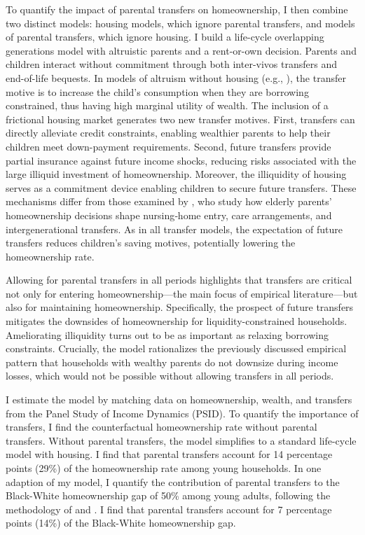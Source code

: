 \documentclass[12pt]{article}
\begin{document}
To quantify the impact of parental transfers on homeownership, I then combine two distinct models: housing models, which ignore parental transfers, and models of parental transfers, which ignore housing. I build a life-cycle overlapping generations model with altruistic parents and a rent-or-own decision. Parents and children interact without commitment through both inter-vivos transfers and end-of-life bequests. In models of altruism without housing (e.g., \citealp{Altonji1997a,Barczyk2014}), the transfer motive is to increase the child's consumption when they are borrowing constrained, thus having high marginal utility of wealth. The inclusion of a frictional housing market generates two new transfer motives. First, transfers can directly alleviate credit constraints, enabling wealthier parents to help their children meet down-payment requirements. Second, future transfers provide partial insurance against future income shocks, reducing risks associated with the large illiquid investment of homeownership. Moreover, the illiquidity of housing serves as a commitment device enabling children to secure future transfers. These mechanisms differ from those examined by \citet{Barczyk2020a}, who study how elderly parents’ homeownership decisions shape nursing‑home entry, care arrangements, and intergenerational transfers. As in all transfer models, the expectation of future transfers reduces children's saving motives, potentially lowering the homeownership rate.

Allowing for parental transfers in all periods highlights that transfers are critical not only for entering homeownership---the main focus of empirical literature---but also for maintaining homeownership. Specifically, the prospect of future transfers mitigates the downsides of homeownership for liquidity-constrained households. Ameliorating illiquidity turns out to be as important as relaxing borrowing constraints. Crucially, the model rationalizes the previously discussed empirical pattern that households with wealthy parents do not downsize during income losses, which would not be possible without allowing transfers in all periods. 

I estimate the model by matching data on homeownership, wealth, and transfers from the Panel Study of Income Dynamics (PSID). To quantify the importance of transfers, I find the counterfactual homeownership rate without parental transfers. Without parental transfers, the model simplifies to a standard life-cycle model with housing. I find that parental transfers account for 14 percentage points (29\%) of the homeownership rate among young households. In one adaption of my model, I quantify the contribution of parental transfers to the Black-White homeownership gap of 50\% among young adults, following the  methodology of \cite{Ashman2020} and \cite{aliprantis2022dynamics}. I find that parental transfers account for 7 percentage points (14\%) of the Black-White homeownership gap. 
\end{document}
